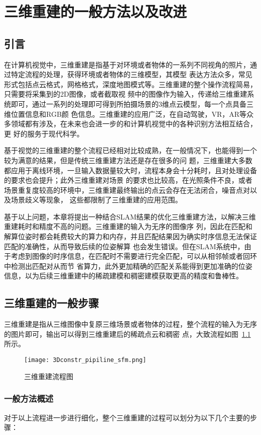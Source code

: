 \chapter{三维重建的一般方法以及改进}
\label{cha:chap3}
\section{引言}
\label{sec:3.1}
在计算机视觉中，三维重建是指基于对环境或者物体的一系列不同视角的照片，通过特定流程的处理，获得环境或者物体的三维模型，其模型
表达方法众多，常见形式包括点云格式，网格格式，深度地图模式等。三维重建的整个操作流程简易，只需要将采集到的2D图像，或者截取视
频中的图像作为输入，传递给三维重建系统即可，通过一系列的处理即可得到所拍摄场景的3维点云模型，每一个点具备三维位置信息和RGB颜
色信息。三维重建的应用广泛，在自动驾驶，VR，AR等众多领域都有涉及，在未来也会进一步的和计算机视觉中的各种识别方法相互结合，更
好的服务于现代科学。

基于视觉的三维重建的整个流程已经相对比较成熟，在一般情况下，也能得到一个较为满意的结果，但是传统三维重建方法还是存在很多的问
题，三维重建大多数都应用于离线环境，一旦输入数据量较大时，流程本身会十分耗时，且对处理设备的要求也会提升；此外三维重建对场景
的要求也比较高，在光照条件不良，或者场景重复度较高的环境中，三维重建最终输出的点云会存在无法闭合，噪音点对以及场景歧义等现象，
这些都限制了三维重建的应用范围。

基于以上问题，本章将提出一种结合SLAM结果的优化三维重建方法，以解决三维重建耗时和精度不高的问题。三维重建的输入为无序的图像序
列，因此在匹配和解算位姿时都会耗费较大的算力和内存，并且匹配结果因为确实时序信息无法保证匹配的准确性，从而导致后续的位姿解算
也会发生错误。但在SLAM系统中，由于考虑到图像的时序信息，在匹配时不需要进行完全匹配，可以从相邻帧或者回环中检测出匹配对从而节
省算力，此外更加精确的匹配关系能得到更加准确的位姿信息，以为后续三维重建中的稀疏建模和稠密建模获取更高的精度和鲁棒性。
\section{三维重建的一般步骤}
\label{sec:3.2}
三维重建是指从三维图像中复原三维场景或者物体的过程，整个流程的输入为无序的图片即可，输出可以得到三维重建后的稀疏点云和稠密
点，大致流程如图~\ref{fig:3Dconstr_pipiline_sfm}所示。
\begin{figure}[H] %
    \centering
    \texttt{[image: 3Dconstr\_pipiline\_sfm.png]}
    \caption{三维重建流程图}
    \label{fig:3Dconstr_pipiline_sfm}
    \end{figure}
\subsection{一般方法概述}
\label{sec:3.2.1}
对于以上流程进一步进行细化，整个三维重建的过程可以划分为以下几个主要的步骤：

